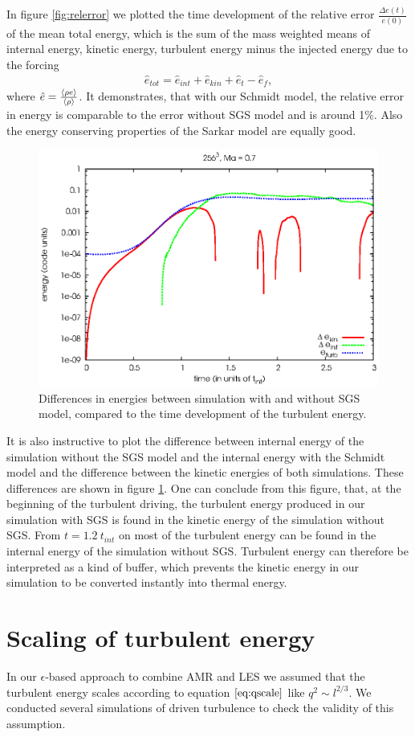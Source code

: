 In figure \ref{fig:relerror} we plotted the time development of the relative
error $\frac{\Delta e(t)}{e(0)}$ of the mean total energy,
which is the sum of the mass weighted means of internal energy, kinetic energy,
turbulent energy minus the injected energy due to the forcing
\begin{align}
\hat{e}_{tot}= \hat{e}_{int}+\hat{e}_{kin}+\hat{e}_t-\hat{e}_f, 
\end{align}
where $\hat{e} = \frac{\langle \rho e \rangle}{\langle \rho \rangle}$. It demonstrates, that with
our Schmidt model, the relative error in energy is comparable to the error
without SGS model and is around 1\%. Also the energy conserving properties of
the Sarkar model are equally good. 

\begin{figure}[tp]
\centering
\includegraphics[width=0.7\linewidth]{chapter7/diffenergy2.eps}
\caption{Differences in energies between simulation with and without SGS model,
compared to the time development of the turbulent energy.}
\label{fig:diffenergy}
\end{figure}

It is also instructive to plot the difference between internal energy of the
simulation without the SGS model and the internal energy with the Schmidt model
and the
difference between the kinetic energies of both simulations. These differences
are shown in figure \ref{fig:diffenergy}. One can conclude from this figure,
that, at the beginning of the turbulent driving, the turbulent energy produced
in our simulation with SGS is found in the kinetic energy of the
simulation without SGS. From $t=1.2\ t_{int}$ on most of the turbulent energy
can be found in the internal energy of the simulation without SGS.
Turbulent energy can therefore be interpreted as a kind of buffer, which
prevents the kinetic energy in our simulation to be converted instantly into
thermal energy.  

\section{Scaling of turbulent energy}\label{eturbscale}
In our $\epsilon$-based approach to combine AMR and LES we assumed that the
turbulent energy scales according to equation $\eqref{eq:qscale}$ like
$q^2 \sim l^{2/3}$. We conducted several simulations of driven turbulence to
check the validity of this assumption.

